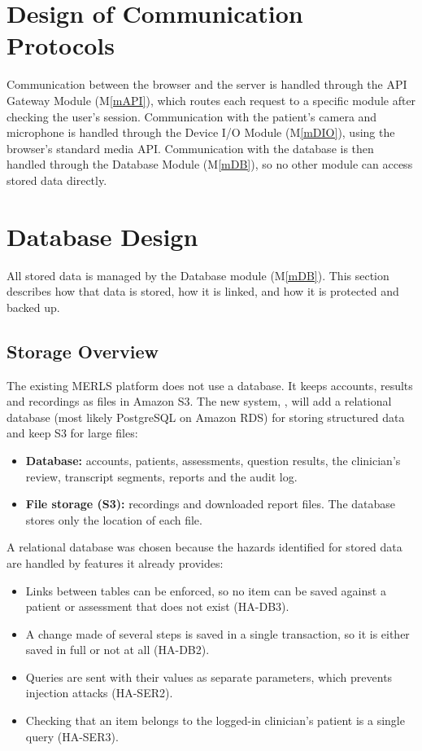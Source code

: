 \documentclass[12pt, titlepage]{article}
\newcommand{\mref}[1]{M\ref{#1}}
\begin{document}
\newpage

\section{Design of Communication Protocols}

Communication between the browser and the server is handled through the API Gateway Module (\mref{mAPI}),
which routes each request to a specific module after checking the user's session. 
Communication with the patient's camera and microphone is handled through the 
Device I/O Module (\mref{mDIO}), using the browser's standard media API. 
Communication with the database is then handled through the Database Module (\mref{mDB}), 
so no other module can access stored data directly.

\section{Database Design} \label{SecDB}

All stored data is managed by the Database module (\mref{mDB}). This section describes how that data is stored, how it is linked, and how it is protected and backed up.

\subsection{Storage Overview}

The existing MERLS platform does not use a database. It keeps accounts, results and recordings as files in Amazon S3. The new system, \progname{}, will add a relational database (most likely PostgreSQL on Amazon RDS) for storing structured data and keep S3 for large files:

\begin{itemize}
\item \textbf{Database:} accounts, patients, assessments, question results, the clinician's review, transcript segments, reports and the audit log.
\item \textbf{File storage (S3):} recordings and downloaded report files. The database stores only the location of each file.
\end{itemize}

A relational database was chosen because the hazards identified for stored data are handled by features it already provides:
\begin{itemize}
\item Links between tables can be enforced, so no item can be saved against a patient or assessment that does not exist (HA-DB3).
\item A change made of several steps is saved in a single transaction, so it is either saved in full or not at all (HA-DB2).
\item Queries are sent with their values as separate parameters, which prevents injection attacks (HA-SER2).
\item Checking that an item belongs to the logged-in clinician's patient is a single query (HA-SER3).
\end{itemize}
\end{document}
